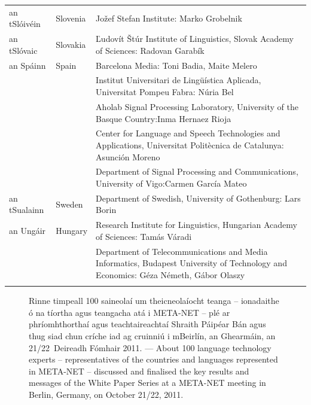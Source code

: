 \begin{longtable}{@{}llp{113mm}@{}}
  an tSlóivéin & \textcolor{grey1}{Slovenia} & Jožef Stefan Institute: Marko Grobelnik \\ \addlinespace
   
  an tSlóvaic & \textcolor{grey1}{Slovakia} & Ľudovít Štúr Institute of Linguistics, Slovak Academy of Sciences: Radovan Garabík \\ \addlinespace
   
  an Spáinn & \textcolor{grey1}{Spain} & Barcelona Media: Toni Badia, Maite Melero \\ \addlinespace 
  & & Institut Universitari de Lingüística Aplicada, Universitat Pompeu Fabra: Núria Bel \\ \addlinespace 
  & & Aholab Signal Processing Laboratory, University of the Basque Country:\newline Inma Hernaez Rioja \\ \addlinespace 
  & & Center for Language and Speech Technologies and Applications, Universitat Politècnica de Catalunya:  Asunción Moreno \\ \addlinespace 
  & & Department of Signal Processing and Communications, University of Vigo:\newline Carmen García Mateo \\ \addlinespace
  
  an tSualainn & \textcolor{grey1}{Sweden} & Department of Swedish, University of Gothenburg: Lars Borin \\ \addlinespace
   
  an Ungáir & \textcolor{grey1}{Hungary} & Research Institute for Linguistics, Hungarian Academy of Sciences: Tamás Váradi\\  \addlinespace
  & & Department of Telecommunications and Media Informatics, Budapest University of Technology and Economics: Géza Németh, Gábor Olaszy\\ \addlinespace
  
\end{longtable}
\normalsize

\renewcommand*{\figureformat}{}
\renewcommand*{\captionformat}{}

\begin{figure}[htbp]
  \center
  \caption{Rinne timpeall 100 saineolaí um theicneolaíocht teanga -- ionadaithe ó na tíortha agus teangacha atá i META-NET -- plé ar phríomhthorthaí agus teachtaireachtaí Shraith Páipéar Bán agus thug siad chun críche iad ag cruinniú i mBeirlín, an Ghearmáin, an 21/22~Deireadh Fómhair 2011. --- \textcolor{grey1}{About 100 language technology experts -- representatives of the countries and languages represented in META-NET -- discussed and finalised the key results and messages of the White Paper Series at a META-NET meeting in Berlin, Germany, on October 21/22, 2011.}} %
 \medskip
\end{figure}

